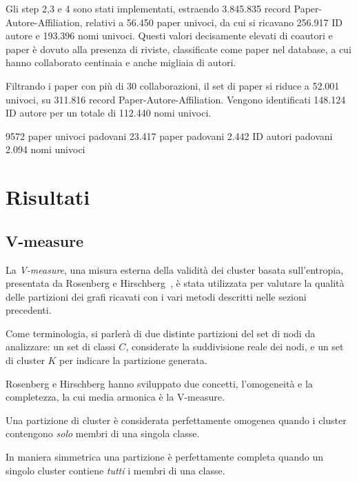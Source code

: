 \documentclass[12pt,a4paper,twoside]{report}
\begin{document}
Gli step 2,3 e 4 sono stati implementati, estraendo 3.845.835 record Paper-Autore-Affiliation,
relativi a 56.450 paper univoci, da cui si ricavano 256.917 ID autore e 193.396 nomi univoci. Questi
valori decisamente elevati di coautori e paper è dovuto alla presenza di riviste, classificate come
paper nel database, a cui hanno collaborato centinaia e anche migliaia di autori.

Filtrando i paper con più di 30 collaborazioni, il set di paper si riduce a 52.001 univoci, su
311.816 record Paper-Autore-Affiliation. Vengono identificati 148.124 ID autore per un totale di
112.440 nomi univoci.

9572 paper univoci padovani
23.417 paper padovani
2.442 ID autori padovani
2.094 nomi univoci



\whitePage
\chapter{Risultati} \label{cap:risultati}

\section{V-measure} \label{sec:vmeasure}

La \textit{V-measure}, una misura esterna della validità
dei cluster basata sull'entropia, presentata da Rosenberg e Hirschberg~\cite{vmeasure}, è stata
utilizzata per valutare la qualità delle partizioni dei grafi ricavati con i vari metodi descritti
nelle sezioni precedenti.


Come terminologia, si parlerà di due distinte partizioni del set di nodi da analizzare: un set di
classi $C$, considerate la suddivisione reale dei nodi, e un set di cluster $K$ per indicare la
partizione generata.

Rosenberg e Hirschberg hanno sviluppato due concetti, l'omogeneità e la completezza, la cui media
armonica è la V-measure.

Una partizione di cluster è considerata perfettamente omogenea quando i cluster contengono
\textit{solo} membri di una singola classe.

In maniera simmetrica una partizione è perfettamente completa quando un singolo cluster contiene
\textit{tutti} i membri di una classe.
\end{document}
